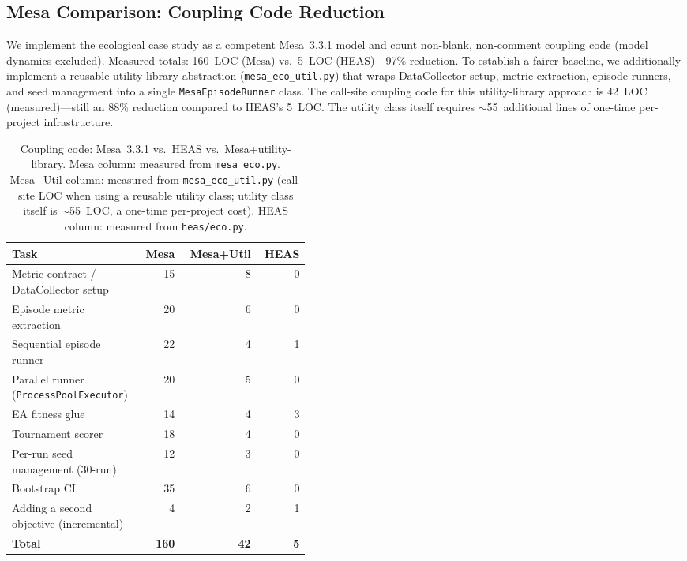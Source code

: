 \documentclass{wscpaperproc}
\begin{document}
\subsection{Mesa Comparison: Coupling Code Reduction}
\label{sec:mesa-comparison}

We implement the ecological case study as a competent Mesa~3.3.1 model and
count non-blank, non-comment coupling code (model dynamics excluded).
Measured totals: 160~LOC (Mesa) vs.\ 5~LOC (HEAS)---97\% reduction.
To establish a fairer baseline, we additionally implement a reusable
utility-library abstraction (\texttt{mesa\_eco\_util.py}) that wraps
DataCollector setup, metric extraction, episode runners, and seed management
into a single \texttt{MesaEpisodeRunner} class. The call-site coupling code
for this utility-library approach is 42~LOC (measured)---still an 88\%
reduction compared to HEAS's 5~LOC. The utility class itself requires
$\sim$55~additional lines of one-time per-project infrastructure.

\begin{table}[ht]
\caption{Coupling code: Mesa~3.3.1 vs.\ HEAS vs.\ Mesa+utility-library.
  Mesa column: measured from \texttt{mesa\_eco.py}.
  Mesa+Util column: measured from \texttt{mesa\_eco\_util.py} (call-site LOC
  when using a reusable utility class; utility class itself is $\sim$55~LOC,
  a one-time per-project cost). HEAS column: measured from \texttt{heas/eco.py}.}
\label{tab:loc}
\centering\small
\begin{tabular}{p{0.44\linewidth}rrr}
\toprule
Task & Mesa & Mesa+Util & HEAS \\
\midrule
Metric contract / DataCollector setup   & 15 & 8  & 0 \\
Episode metric extraction               & 20 & 6  & 0 \\
Sequential episode runner               & 22 & 4  & 1 \\
Parallel runner (\texttt{ProcessPoolExecutor}) & 20 & 5  & 0 \\
EA fitness glue                         & 14 & 4  & 3 \\
Tournament scorer                       & 18 & 4  & 0 \\
Per-run seed management (30-run)        & 12 & 3  & 0 \\
Bootstrap CI                            & 35 & 6  & 0 \\
Adding a second objective (incremental) & 4  & 2  & 1 \\
\midrule
\textbf{Total}                          & \textbf{160} & \textbf{42} & \textbf{5} \\
\bottomrule
\end{tabular}
\end{table}
\end{document}
